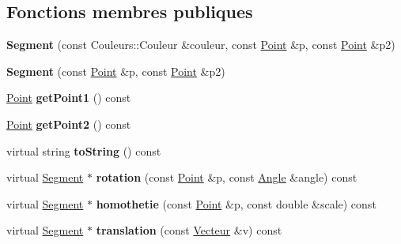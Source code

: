 \subsection*{Fonctions membres publiques}
\begin{DoxyCompactItemize}
\item 
\hypertarget{class_segment_a865329de55a466d2ed10d092c0c5a45c}{{\bfseries Segment} (const Couleurs\+::\+Couleur \&couleur, const \hyperlink{class_point}{Point} \&p, const \hyperlink{class_point}{Point} \&p2)}\label{class_segment_a865329de55a466d2ed10d092c0c5a45c}

\item 
\hypertarget{class_segment_ab38dc6686cba332ad3a4200c391f0a1a}{{\bfseries Segment} (const \hyperlink{class_point}{Point} \&p, const \hyperlink{class_point}{Point} \&p2)}\label{class_segment_ab38dc6686cba332ad3a4200c391f0a1a}

\item 
\hypertarget{class_segment_ae51cb5320a024cdf469de58dc01529c4}{\hyperlink{class_point}{Point} {\bfseries get\+Point1} () const }\label{class_segment_ae51cb5320a024cdf469de58dc01529c4}

\item 
\hypertarget{class_segment_a7e7329612c9a022775b6e82678b7b1c1}{\hyperlink{class_point}{Point} {\bfseries get\+Point2} () const }\label{class_segment_a7e7329612c9a022775b6e82678b7b1c1}

\item 
\hypertarget{class_segment_a0a3105557d1d22b5fbecd4b5aef5a49f}{virtual string {\bfseries to\+String} () const }\label{class_segment_a0a3105557d1d22b5fbecd4b5aef5a49f}

\item 
\hypertarget{class_segment_ab180d3d792d6a4a58decc85e596cfd2b}{virtual \hyperlink{class_segment}{Segment} $\ast$ {\bfseries rotation} (const \hyperlink{class_point}{Point} \&p, const \hyperlink{class_angle}{Angle} \&angle) const }\label{class_segment_ab180d3d792d6a4a58decc85e596cfd2b}

\item 
\hypertarget{class_segment_ae83d6693cd1444b75cbb001ae730a703}{virtual \hyperlink{class_segment}{Segment} $\ast$ {\bfseries homothetie} (const \hyperlink{class_point}{Point} \&p, const double \&scale) const }\label{class_segment_ae83d6693cd1444b75cbb001ae730a703}

\item 
\hypertarget{class_segment_af140a6dc21ac42ded1d427f43e875106}{virtual \hyperlink{class_segment}{Segment} $\ast$ {\bfseries translation} (const \hyperlink{class_vecteur}{Vecteur} \&v) const }\label{class_segment_af140a6dc21ac42ded1d427f43e875106}


\end{DoxyCompactItemize}
